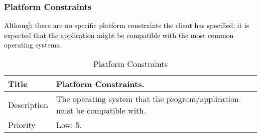 \subsubsection{Platform Constraints}
  \label{system-constraints/budget-and-schedule/platform-title}
  Although there are no specific platform constraints the client has specified,
  it is expected that the application might be compatible with the most common
  operating systems.

  \begin{table}[h!]
    \caption{Platform Constraints}
    \label{system-constraints/platform/platform-table}
    \begin{tabularx}{\textwidth}{|l|X|}
      \hline
      Title       & Platform Constraints. \\ \hline
Description &   The operating system that the program/application must be compatible with. \\ \hline
      Priority    & Low: 5. \\ \hline
    \end{tabularx}
  \end{table}
